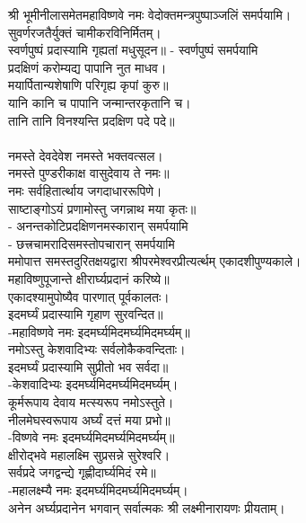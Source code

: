 श्री भूमीनीलासमेतमहाविष्णवे नमः वेदोक्तमन्त्रपुष्पाञ्जलिं समर्पयामि।\\

सुवर्णरजतैर्युक्तं चामीकरविनिर्मितम्।\\
स्वर्णपुष्पं प्रदास्यामि गृह्यतां मधुसूदन॥ - स्वर्णपुष्पं समर्पयामि\\
 
प्रदक्षिणं करोम्यद्य पापानि नुत माधव।\\
मयार्पितान्यशेषाणि परिगृह्य कृपां कुरु॥\\
 यानि कानि च पापानि जन्मान्तरकृतानि च।\\
तानि तानि विनश्यन्ति प्रदक्षिण पदे पदे॥\\
 \\
नमस्ते देवदेवेश नमस्ते भक्तवत्सल।\\
नमस्ते पुण्डरीकाक्ष वासुदेवाय ते नमः॥\\
नमः सर्वहितार्त्थाय जगदाधाररूपिणे।\\
साष्टाङ्गोऽयं प्रणामोस्तु जगन्नाथ मया कृतः॥\\
- अनन्तकोटिप्रदक्षिणनमस्कारान् समर्पयामि\\
 - छत्त्रचामरादिसमस्तोपचारान् समर्पयामि\\

ममोपात्त समस्तदुरितक्षयद्वारा श्रीपरमेश्वरप्रीत्यर्त्थम् एकादशीपुण्यकाले।\\
 महाविष्णुपूजान्ते क्षीरार्घ्यप्रदानं करिष्ये॥\\

एकादश्यामुपोष्यैव पारणात् पूर्वकालतः।\\
इदमर्घ्यं प्रदास्यामि गृहाण सुरवन्दित॥\\
	-महाविष्णवे नमः इदमर्घ्यमिदमर्घ्यमिदमर्घ्यम्॥\\
नमोऽस्तु केशवादिभ्यः सर्वलोकैकवन्दिताः।\\
इदमर्घ्यं प्रदास्यामि सुप्रीतो भव सर्वदा॥\\
	-केशवादिभ्यः इदमर्घ्यमिदमर्घ्यमिदमर्घ्यम्।\\
कूर्मरूपाय देवाय मत्स्यरूप नमोऽस्तुते। \\
नीलमेघस्वरूपाय अर्घ्यं दत्तं मया प्रभो॥\\
	-विष्णवे नमः इदमर्घ्यमिदमर्घ्यमिदमर्घ्यम्॥\\
 क्षीरोद्भवे महालक्ष्मि सुप्रसन्ने सुरेश्वरि।\\
सर्वप्रदे जगद्वन्द्ये गृह्णीदार्घ्यमिदं रमे॥ \\
	-महालक्ष्म्यै नमः इदमर्घ्यमिदमर्घ्यमिदमर्घ्यम्।\\
अनेन अर्घ्यप्रदानेन भगवान् सर्वात्मकः श्री लक्ष्मीनारायणः प्रीयताम्।\\

